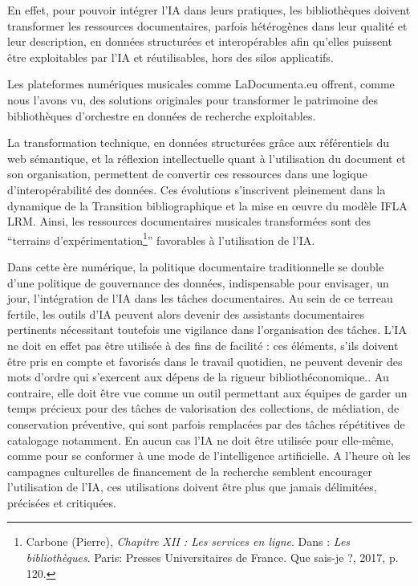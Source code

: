 En effet, pour pouvoir intégrer l'IA dans leurs pratiques, les bibliothèques doivent transformer les ressources documentaires, parfois hétérogènes dans leur qualité et leur description, en données structurées et interopérables afin qu'elles puissent être exploitables par l'IA et réutilisables, hors des silos applicatifs. 


Les plateformes numériques musicales comme LaDocumenta.eu offrent, comme nous l'avons vu, des solutions originales pour transformer le patrimoine des bibliothèques d'orchestre en données de recherche exploitables. 

La transformation technique, en données structurées grâce aux référentiels du web sémantique, et la réflexion intellectuelle quant à l'utilisation du document et son organisation, permettent de convertir ces ressources dans une logique d'interopérabilité des données. Ces évolutions s'inscrivent pleinement dans la dynamique de la Transition bibliographique et la mise en œuvre du modèle IFLA LRM. 
Ainsi, les ressources documentaires musicales transformées sont des \enquote{terrains d'expérimentation\footnote{Carbone (Pierre), \textit{Chapitre XII : Les services en ligne}. Dans : \textit{Les bibliothèques}. Paris: Presses Universitaires de France. Que sais-je ?, 2017, p. 120.}} favorables à l'utilisation de l'IA. 

Dans cette ère numérique, la politique documentaire traditionnelle se double d'une politique de gouvernance des données, indispensable pour envisager, un jour, l'intégration de l'IA dans les tâches documentaires. Au sein de ce terreau fertile, les outils d'IA peuvent alors devenir des assistants documentaires pertinents nécessitant toutefois une vigilance dans l'organisation des tâches. L'IA ne doit en effet pas être utilisée à des fins de facilité : ces éléments, s'ils doivent être pris en compte et favorisés dans le travail quotidien, ne peuvent devenir des mots d'ordre qui s'exercent aux dépens de la rigueur bibliothéconomique.. Au contraire, elle doit être vue comme un outil permettant aux équipes de garder un temps précieux pour des tâches de valorisation des collections, de médiation, de conservation préventive, qui sont parfois remplacées par des tâches répétitives de catalogage notamment. En aucun cas l'IA ne doit être utilisée pour elle-même, comme pour se conformer à une mode de l'intelligence artificielle. A l'heure où les campagnes culturelles de financement de la recherche semblent encourager l'utilisation de l'IA, ces utilisations doivent être plus que jamais délimitées, précisées et critiquées. 

